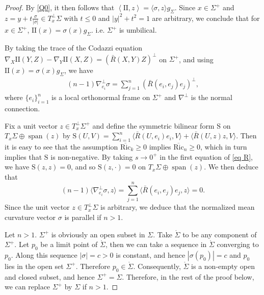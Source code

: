 \documentclass[11pt, reqno]{amsart}
\numberwithin{equation}{section}
\begin{document}
\begin{proof}
By \eqref{Q0}, it then follows that $\left\langle\mathrm{II}, z\right\rangle=\langle \sigma, z\rangle g_\Sigma$.
Since $x \in \Sigma^{+}$ and $z=y+t\frac{\sigma}{|\sigma|}\in T^\perp_x\Sigma$ with $t\le0$ and $|y|^2+t^2=1$ are arbitrary, we conclude that
for $x\in \Sigma^+$, $\mathrm{II}(x)=\sigma(x) g_\Sigma$. i.e. $\Sigma^+$ is umbilical.

By taking the trace of the Codazzi equation $\nabla_X \mathrm{II}(Y, Z)-\nabla_Y \mathrm{II}(X, Z)=(\bar{R}(X, Y) Z)^\perp$ on $\Sigma^+$, and using $\mathrm{II}(x)=\sigma(x) g_{\Sigma}$, we have
\begin{align*}
(n-1)\nabla^\perp_{e_i}\sigma=\sum_{j=1}^n \left(\bar{R}\left(e_i, e_j\right) e_j\right)^{\perp},
\end{align*}
where $\{e_i\}_{i=1}^{n}$ is a local orthonormal frame on $\Sigma^+$ and $\nabla^\perp$ is the normal connection.

Fix a unit vector $z\in T_x^\perp \Sigma^+$ and define the symmetric bilinear form $\mathrm{S}$ on $T_x\Sigma \oplus\operatorname{span} (z)$ by $\mathrm{S}(U, V)=\sum_{i=1}^{n}\langle \bar R(U, e_i)e_i, V\rangle+\langle \bar R(U, z)z, V\rangle$. Then it is easy to see that the assumption $\overline {\mathrm{Ric}}_k\ge0$ implies $\overline {\mathrm{Ric}}_{n}\ge 0$, which in turn implies that $\mathrm{S}$ is non-negative.
By taking $s\to0^+$ in the first equation of \eqref{eq R}, we have
$\mathrm{S}(z, z)=0$, and so $\mathrm{S}(z, \cdot)=0$ on $T_x\Sigma\oplus\operatorname{span}(z)$. We then deduce that
\begin{equation*}
(n-1) \langle \nabla_{e_i}^{\perp} \sigma, z\rangle =\sum_{j=1}^n \langle \bar{R}\left(e_i, e_j\right) e_j, z\rangle=0.
\end{equation*}
Since the unit vector $z\in T_x^\perp \Sigma$ is arbitrary, we deduce that the normalized mean curvature vector $\sigma$ is parallel if $n>1$.

Let $n>1$. $\Sigma^+$ is obviously an open subset in $\Sigma$. Take $\mathring{\Sigma}$ to be any component of $\Sigma^+$. Let $p_0$ be a limit point of $\mathring{\Sigma}$, then we can take a sequence in $\mathring{\Sigma}$ converging to $p_0$. Along this sequence $|\sigma|=c>0$ is constant, and hence $|\sigma(p_0)|=c$ and $p_0$ lies in the open set $\Sigma^+$. Therefore $p_0\in\mathring{\Sigma}$. Consequently, $\mathring{\Sigma}$ is a non-empty open and closed subset, and hence $\Sigma^+=\Sigma$. Therefore, in the rest of the proof below, we can replace $\Sigma^+$ by $\Sigma$ if $n>1$.


\end{proof}
\end{document}
